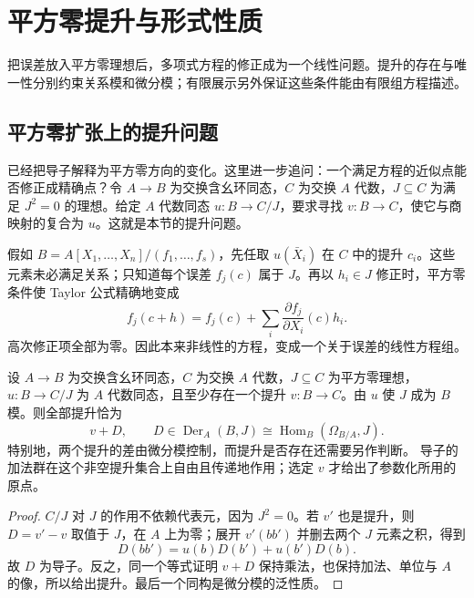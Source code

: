 
\section{平方零提升与形式性质}
\label{b3:sec:2302}

把误差放入平方零理想后，多项式方程的修正成为一个线性问题。提升的存在与唯一性分别约束关系模和微分模；有限展示另外保证这些条件能由有限组方程描述。

%
%
%

\subsection{平方零扩张上的提升问题}
\label{b3:subsec:2302:01}

已经把导子解释为平方零方向的变化。这里进一步追问：一个满足方程的近似点能否修正成精确点？令 \(A\to B\) 为交换含幺环同态，\(C\) 为交换 \(A\) 代数，\(J\subseteq C\) 为满足 \(J^2=0\) 的理想。给定 \(A\) 代数同态 \(u:B\to C/J\)，要求寻找 \(v:B\to C\)，使它与商映射的复合为 \(u\)。这就是本节的提升问题。

\ProseParagraphBreak
假如 \(B=A[X_1,\ldots,X_n]/(f_1,\ldots,f_s)\)，先任取 \(u(\bar X_i)\) 在 \(C\) 中的提升 \(c_i\)。这些元素未必满足关系；只知道每个误差 \(f_j(c)\) 属于 \(J\)。再以 \(h_i\in J\) 修正时，平方零条件使 Taylor 公式精确地变成
\[
	f_j(c+h)=f_j(c)+\sum_i\frac{\partial f_j}{\partial X_i}(c)h_i.
\]
高次修正项全部为零。因此本来非线性的方程，变成一个关于误差的线性方程组。

\begin{lemma}\label{b3:lem:square-zero-lifts-difference}
	设 \(A\to B\) 为交换含幺环同态，\(C\) 为交换 \(A\) 代数，\(J\subseteq C\) 为平方零理想，\(u:B\to C/J\) 为 \(A\) 代数同态，且至少存在一个提升 \(v:B\to C\)。由 \(u\) 使 \(J\) 成为 \(B\) 模。则全部提升恰为
	\[
		v+D,\qquad D\in\operatorname{Der}_A(B,J) \cong\operatorname{Hom}_B(\Omega_{B/A},J).
	\]
	特别地，两个提升的差由微分模控制，而提升是否存在还需要另作判断。 导子的加法群在这个非空提升集合上自由且传递地作用；选定 \(v\) 才给出了参数化所用的原点。
\end{lemma}
\begin{proof}
	\(C/J\) 对 \(J\) 的作用不依赖代表元，因为 \(J^2=0\)。若 \(v'\) 也是提升，则 \(D=v'-v\) 取值于 \(J\)，在 \(A\) 上为零；展开 \(v'(bb')\) 并删去两个 \(J\) 元素之积，得到
	\[
		D(bb')=u(b)D(b')+u(b')D(b).
	\]
	故 \(D\) 为导子。反之，同一个等式证明 \(v+D\) 保持乘法，也保持加法、单位与 \(A\) 的像，所以给出提升。最后一个同构是微分模的泛性质。
\end{proof}

